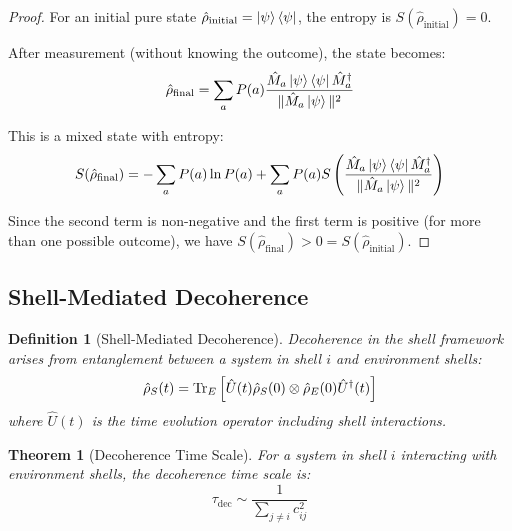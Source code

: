 \documentclass[12pt,a4paper]{article}
\newtheorem{theorem}{Theorem}[section]
\newtheorem{definition}{Definition}[section]
\begin{document}
\begin{proof}
For an initial pure state $\hat{\rho}_{\text{initial}} = \ket{\psi}\bra{\psi}$, the entropy is $S(\hat{\rho}_{\text{initial}}) = 0$.

After measurement (without knowing the outcome), the state becomes:
\begin{equation}
\hat{\rho}_{\text{final}} = \sum_a P(a) \frac{\hat{M}_a \ket{\psi}\bra{\psi} \hat{M}_a^\dagger}{\|\hat{M}_a \ket{\psi}\|^2}
\end{equation}

This is a mixed state with entropy:
\begin{equation}
S(\hat{\rho}_{\text{final}}) = -\sum_a P(a) \ln P(a) + \sum_a P(a) S\left(\frac{\hat{M}_a \ket{\psi}\bra{\psi} \hat{M}_a^\dagger}{\|\hat{M}_a \ket{\psi}\|^2}\right)
\end{equation}

Since the second term is non-negative and the first term is positive (for more than one possible outcome), we have $S(\hat{\rho}_{\text{final}}) > 0 = S(\hat{\rho}_{\text{initial}})$.
\end{proof}

\subsection{Shell-Mediated Decoherence}
\label{subsec:shell-decoherence}

\begin{definition}[Shell-Mediated Decoherence]
\label{def:shell-decoherence}
Decoherence in the shell framework arises from entanglement between a system in shell $i$ and environment shells:
\begin{equation}
\hat{\rho}_S(t) = \Tr_E\left[\hat{U}(t)\hat{\rho}_S(0) \otimes \hat{\rho}_E(0)\hat{U}^\dagger(t)\right]
\end{equation}
where $\hat{U}(t)$ is the time evolution operator including shell interactions.
\end{definition}

\begin{theorem}[Decoherence Time Scale]
\label{thm:decoherence-time}
For a system in shell $i$ interacting with environment shells, the decoherence time scale is:
\begin{equation}
\tau_{\text{dec}} \sim \frac{1}{\sum_{j \neq i} c_{ij}^2}
\end{equation}
\end{theorem}
\end{document}

